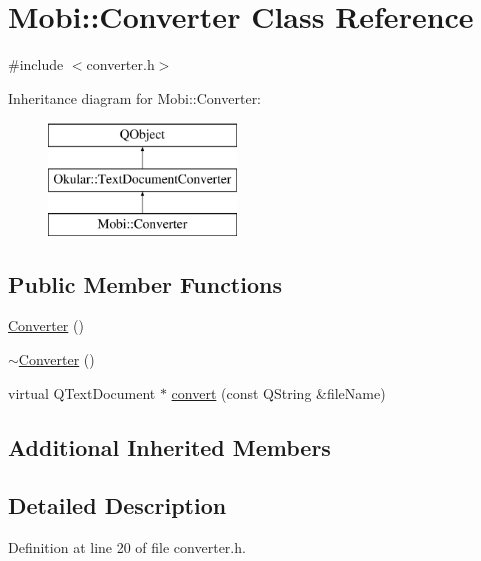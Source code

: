 \hypertarget{classMobi_1_1Converter}{\section{Mobi\+:\+:Converter Class Reference}
\label{classMobi_1_1Converter}
}


{\ttfamily \#include $<$converter.\+h$>$}

Inheritance diagram for Mobi\+:\+:Converter\+:\begin{figure}[H]
\begin{center}
\leavevmode
\includegraphics[height=3.000000cm]{classMobi_1_1Converter}
\end{center}
\end{figure}
\subsection*{Public Member Functions}
\begin{DoxyCompactItemize}
\item 
\hyperlink{classMobi_1_1Converter_a1de81f3e06093411e5d27ce882bc010f}{Converter} ()
\item 
\hyperlink{classMobi_1_1Converter_a9ecd05695a52c03158b81e544e13b996}{$\sim$\+Converter} ()
\item 
virtual Q\+Text\+Document $\ast$ \hyperlink{classMobi_1_1Converter_aa63e543977130604de659a4d725ee8bd}{convert} (const Q\+String \&file\+Name)
\end{DoxyCompactItemize}
\subsection*{Additional Inherited Members}


\subsection{Detailed Description}


Definition at line 20 of file converter.\+h.



